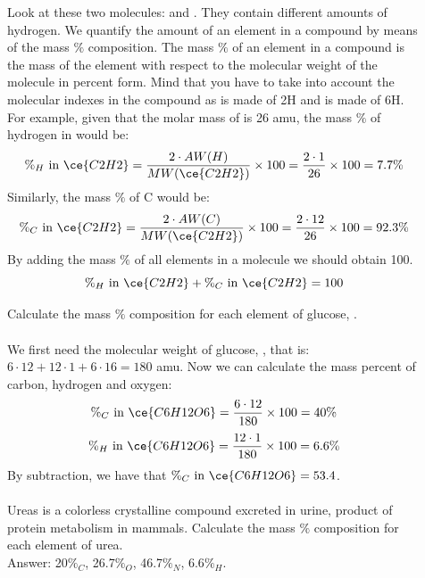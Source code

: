 \documentclass[main.tex]{subfiles}
\begin{document}
\begin{description}
\item[] 
Look at these two molecules:  and . They contain different amounts of hydrogen. We quantify the amount of an element in a compound by means of the mass $\%$ composition. The mass $\%$ of an element in a compound is the mass of the element with respect to the molecular weight of the molecule in percent form. Mind that you have to take into account the molecular indexes in the compound as   is made of 2H and  is made of 6H. For example, given that the molar mass of  is 26 amu, the mass $\%$ of hydrogen in  would be:
\[\%_{H}\text{ in }\ce{C2H2}= \frac{2\cdot AW(H) }{MW(\ce{C2H2})}\times 100=\frac{2\cdot 1}{26}\times 100=7.7\%\]
Similarly, the mass $\%$ of C would be:
\[\%_{C}\text{ in }\ce{C2H2}= \frac{2\cdot AW(C) }{MW(\ce{C2H2})}\times 100=\frac{2\cdot 12}{26}\times 100=92.3\%\]
By adding the mass $\%$ of all elements in a molecule we should obtain 100.
\[\%_{H}\text{ in }\ce{C2H2}+ \%_{C}\text{ in }\ce{C2H2}=100\]


\begin{example} %
Calculate the mass $\%$ composition for each element of glucose, . \\
\\
We first need the molecular weight of glucose, , that is: $6\cdot 12+ 12\cdot 1+6\cdot 16=180$ amu. Now we can calculate the mass percent of carbon, hydrogen and oxygen:
\[\%_{C}\text{ in }\ce{C6H12O6}=\frac{6\cdot 12}{180}\times 100=40\%\]
\[\%_{H}\text{ in }\ce{C6H12O6}=\frac{12\cdot 1}{180}\times 100=6.6\%\]
By subtraction, we have that $\%_{C}\text{ in }\ce{C6H12O6}=53.4$.\\
\faDiamond\ \\
Ureas  is a colorless crystalline compound excreted in urine, product of protein metabolism in mammals. Calculate the mass $\%$ composition for each element of urea.\\
\flushright Answer: 20$\%_C$, 26.7$\%_O$, 46.7$\%_N$, 6.6$\%_H$.
\end{example}%


\end{description}
\end{document}
